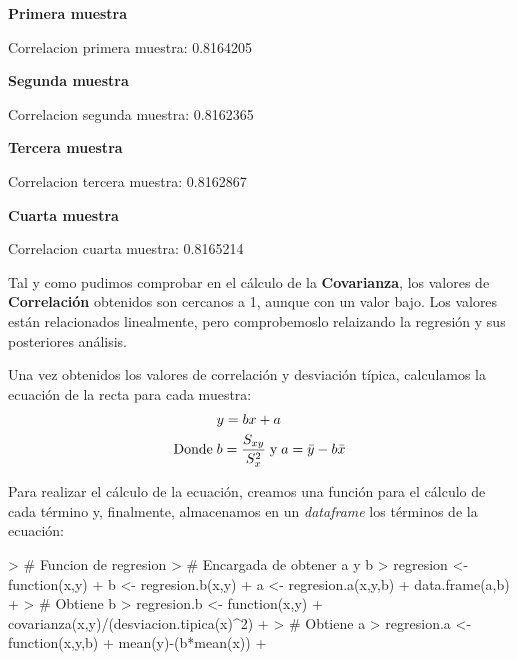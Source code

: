 \documentclass [a4paper] {article}
\begin{document}
\textbf{Primera muestra}
\begin{Schunk}
\begin{Soutput}
Correlacion primera muestra:  0.8164205
\end{Soutput}
\end{Schunk}

\textbf{Segunda muestra}
\begin{Schunk}
\begin{Soutput}
Correlacion segunda muestra:  0.8162365
\end{Soutput}
\end{Schunk}
\newpage
\textbf{Tercera muestra}
\begin{Schunk}
\begin{Soutput}
Correlacion tercera muestra:  0.8162867
\end{Soutput}
\end{Schunk}

\textbf{Cuarta muestra}
\begin{Schunk}
\begin{Soutput}
Correlacion cuarta muestra:  0.8165214
\end{Soutput}
\end{Schunk}

Tal y como pudimos comprobar en el cálculo de la \textbf{Covarianza}, los valores de \textbf{Correlación}
obtenidos son cercanos a 1, aunque con un valor bajo. Los valores están relacionados linealmente, pero
comprobemoslo relaizando la regresión y sus posteriores análisis.

Una vez obtenidos los valores de correlación y desviación típica, calculamos la ecuación de la recta
para cada muestra:
\begin{align*}
 & y = bx + a \\
 \textup{Donde} \; & b = \frac{S_{xy}}{S^2_{x}} \; \textup{y} \; a = \bar{y} - b \bar{x}  
\end{align*}

Para realizar el cálculo de la ecuación, creamos una función para el cálculo de cada término y, finalmente,
almacenamos en un \textit{dataframe} los términos de la ecuación:

\begin{Schunk}
\begin{Sinput}
> # Funcion de regresion
> # Encargada de obtener a y b
> regresion <- function(x,y){
+   b <- regresion.b(x,y)
+   a <- regresion.a(x,y,b)
+   data.frame(a,b)
+ }
> # Obtiene b
> regresion.b <- function(x,y){
+   covarianza(x,y)/(desviacion.tipica(x)^2)
+ }
> # Obtiene a
> regresion.a <- function(x,y,b){
+   mean(y)-(b*mean(x))
+ }
\end{Sinput}
\end{Schunk}
\end{document}
